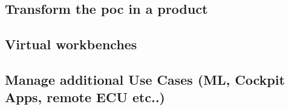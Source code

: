 \subsection{Transform the poc in a product}
\subsection{Virtual workbenches}
\subsection{Manage additional Use Cases (ML, Cockpit Apps, remote ECU etc..)}